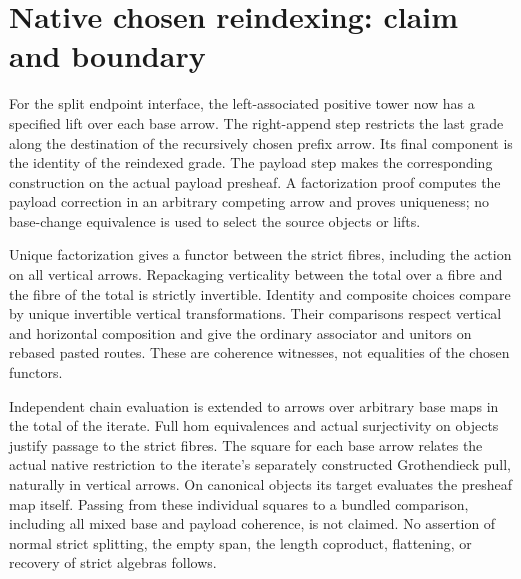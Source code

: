 \documentclass{article}
\begin{document}
\section*{Native chosen reindexing: claim and boundary}
For the split endpoint interface, the left-associated positive tower now has a specified lift over each base arrow. The right-append step restricts the last grade along the destination of the recursively chosen prefix arrow. Its final component is the identity of the reindexed grade. The payload step makes the corresponding construction on the actual payload presheaf. A factorization proof computes the payload correction in an arbitrary competing arrow and proves uniqueness; no base-change equivalence is used to select the source objects or lifts.
\par Unique factorization gives a functor between the strict fibres, including the action on all vertical arrows. Repackaging verticality between the total over a fibre and the fibre of the total is strictly invertible. Identity and composite choices compare by unique invertible vertical transformations. Their comparisons respect vertical and horizontal composition and give the ordinary associator and unitors on rebased pasted routes. These are coherence witnesses, not equalities of the chosen functors.
\par Independent chain evaluation is extended to arrows over arbitrary base maps in the total of the iterate. Full hom equivalences and actual surjectivity on objects justify passage to the strict fibres. The square for each base arrow relates the actual native restriction to the iterate's separately constructed Grothendieck pull, naturally in vertical arrows. On canonical objects its target evaluates the presheaf map itself. Passing from these individual squares to a bundled comparison, including all mixed base and payload coherence, is not claimed. No assertion of normal strict splitting, the empty span, the length coproduct, flattening, or recovery of strict algebras follows.
\end{document}
